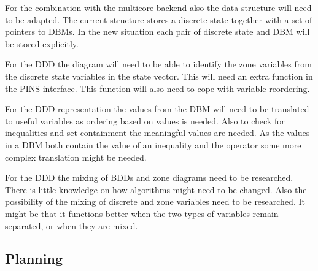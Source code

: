 \documentclass[11pt]{article}
\begin{document}
For the combination with the multicore backend also the data structure will need to be adapted. The current structure stores a discrete state together with a set of pointers to DBMs. In the new situation each pair of discrete state and DBM will be stored explicitly.

For the DDD the diagram will need to be able to identify the zone variables from the discrete state variables in the state vector. This will need an extra function in the PINS interface. This function will also need to cope with variable reordering. 

For the DDD representation the values from the DBM will need to be translated to useful variables as ordering based on values is needed. Also to check for inequalities and set containment the meaningful values are needed. As the values in a DBM both contain the value of an inequality and the operator some more complex translation might be needed. 


For the DDD the mixing of BDDs and zone diagrams need to be researched. There is little knowledge on how algorithms might need to be changed. Also the possibility of the mixing of discrete and zone variables need to be researched. It might be that it functions better when the two types of variables remain separated, or when they are mixed.

\subsection{Planning}

{}

\end{document}
